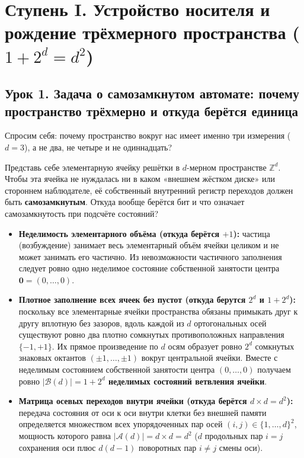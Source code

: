 \chapter{Ступень I. Устройство носителя и рождение трёхмерного пространства (\texorpdfstring{$1 + 2^d = d^2$}{1 + 2\^d = d\^2})}
\label{ch:course-stage1-carrier}

\section{Урок 1. Задача о самозамкнутом автомате: почему пространство трёхмерно и откуда берётся единица}

Спросим себя: почему пространство вокруг нас имеет именно три измерения ($d = 3$), а не два, не четыре и не одиннадцать?

Представь себе элементарную ячейку решётки в $d$-мерном пространстве $\mathbb{Z}^d$. Чтобы эта ячейка не нуждалась ни в каком «внешнем жёстком диске» или стороннем наблюдателе, её собственный внутренний регистр переходов должен быть \textbf{самозамкнутым}. Откуда вообще берётся бит и что означает самозамкнутость при подсчёте состояний?
\begin{itemize}[noitemsep]
\item \textbf{Неделимость элементарного объёма (откуда берётся $+1$):} частица (возбуждение) занимает весь элементарный объём ячейки целиком и не может занимать его частично. Из невозможности частичного заполнения следует ровно одно неделимое состояние собственной занятости центра $\mathbf{0} = (0, \dots, 0)$.
\item \textbf{Плотное заполнение всех ячеек без пустот (откуда берутся $2^d$ и $1 + 2^d$):} поскольку все элементарные ячейки пространства обязаны примыкать друг к другу вплотную без зазоров, вдоль каждой из $d$ ортогональных осей существуют ровно два плотно сомкнутых противоположных направления $\{-1, +1\}$. Их прямое произведение по $d$ осям образует ровно $2^d$ сомкнутых знаковых октантов $(\pm 1, \dots, \pm 1)$ вокруг центральной ячейки. Вместе с неделимым состоянием собственной занятости центра $(0, \dots, 0)$ получаем ровно \textbf{$|\mathcal{B}(d)| = 1 + 2^d$ неделимых состояний ветвления ячейки}.
\item \textbf{Матрица осевых переходов внутри ячейки (откуда берётся $d \times d = d^2$):} передача состояния от оси к оси внутри клетки без внешней памяти определяется множеством всех упорядоченных пар осей $(i, j) \in \{1, \dots, d\}^2$, мощность которого равна \textbf{$|\mathcal{A}(d)| = d \times d = d^2$} ($d$ продольных пар $i = j$ сохранения оси плюс $d(d-1)$ поворотных пар $i \ne j$ смены оси).
\end{itemize}

